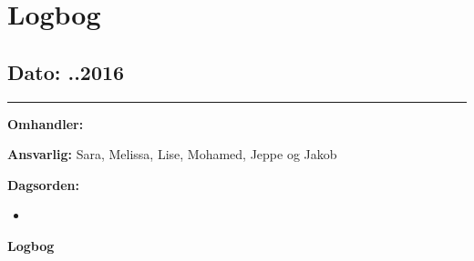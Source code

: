 \chapter{Logbog}

\section{Dato: ..2016}
\hrule

\textbf{Omhandler:}

\textbf{Ansvarlig:} Sara, Melissa, Lise, Mohamed, Jeppe og Jakob

\textbf{Dagsorden:}
\begin{itemize}
	\item 
\end{itemize}

\textbf{Logbog}
\\
\\ \\



